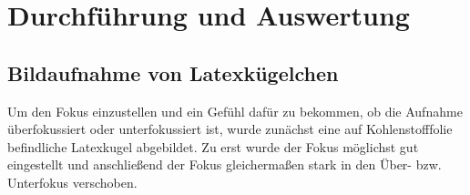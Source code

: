 \documentclass[slug=TEM, room=IFW, supervisor=?, coursedate=23.\ 01.\ 2020]{../../Lab_Report_LaTeX/lab_report}
\begin{document}
\section{Durchf\"uhrung und Auswertung}
\label{sec:durchaus}

\subsection{Bildaufnahme von Latexkügelchen}
\label{sec:latex}

Um den Fokus einzustellen und ein Gefühl dafür zu bekommen, ob die Aufnahme überfokussiert oder
unterfokussiert ist, wurde zunächst eine auf Kohlenstofffolie befindliche Latexkugel abgebildet.
Zu erst wurde der Fokus möglichst gut eingestellt und anschließend der Fokus gleichermaßen stark
in den Über- bzw. Unterfokus verschoben.
\end{document}
